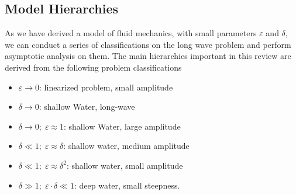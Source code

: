 \subsection{Model Hierarchies}
As we have derived a model of fluid mechanics, with small parameters
$\varepsilon$ and $\delta$, we can conduct a series of classifications on the
long wave problem and perform asymptotic analysis on them. The main
hierarchies important in this review are derived from the following problem
classifications
\begin{itemize}
    \item $\varepsilon\rightarrow 0$: linearized problem, small amplitude
    \item $\delta\rightarrow 0$: shallow Water, long-wave
    \item$\delta \rightarrow 0;\; \varepsilon\approx1$: shallow Water, large
        amplitude
    \item $\delta\ll 1;\; \varepsilon\approx\delta$: shallow water, medium
        amplitude
    \item $\delta\ll 1;\; \varepsilon\approx\delta^2$: shallow water, small
        amplitude
    \item $\delta \gg 1;\; \varepsilon\cdot\delta\ll 1$: deep water, small
        steepness.
\end{itemize}



